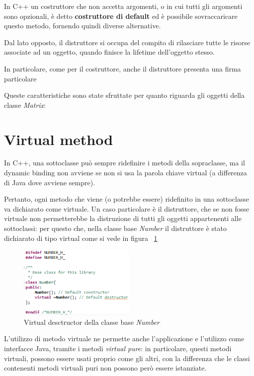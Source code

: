 In C++ un costruttore che non accetta argomenti, o in cui tutti gli argomenti sono opzionali, è detto \textbf{costruttore di default} ed è possibile sovraccaricare questo metodo, fornendo quindi diverse alternative.

Dal lato opposto, il distruttore si occupa del compito di rilasciare tutte le risorse associate ad un oggetto, quando finisce la lifetime dell'oggetto stesso.

In particolare, come per il costruttore, anche il distruttore presenta una firma particolare

Queste caratteristiche sono state sfruttate per quanto riguarda gli oggetti della classe \textit{Matrix}: 

\section{Virtual method}
In C++, una sottoclasse può sempre ridefinire i metodi della sopraclasse, ma il dynamic binding non
avviene se non si usa la parola chiave virtual (a differenza di Java dove avviene sempre).

Pertanto, ogni metodo che viene (o potrebbe essere) ridefinito in una sottoclasse va dichiarato come virtuale.
Un caso particolare è il distruttore, che se non fosse virtuale non permetterebbe la distruzione di
tutti gli oggetti appartenenti alle sottoclassi: per questo che, nella classe base \textit{Number} il distruttore è stato dichiarato di tipo virtual come si vede in figura ~\ref{fig:VirtualDesctructor}

\begin{figure}[h]
	\centering
	\includegraphics[width=0.5\textwidth]{Immagini/VirtualDestructor.png}
	\caption{Virtual desctructor della classe base \textit{Number}}
	\label{fig:VirtualDesctructor}
\end{figure}

L'utilizzo di metodo virtuale ne permette anche l'applicazione e l'utilizzo come interfacce Java, tramite i metodi \textit{virtual pure}: in particolare, questi metodi virtuali, possono essere usati proprio come gli altri, con la differenza che le classi contenenti metodi virtuali puri non possono però essere istanziate.

